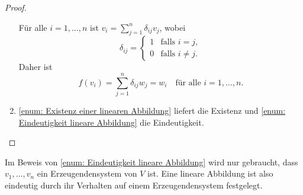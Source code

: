 \documentclass[a4paper,10pt]{article}
\begin{document}
\begin{proof}
\begin{enumerate}[label=\roman*)]
   Für alle $i = 1, \dotsc, n$ ist $v_i = \sum_{j=1}^n \delta_{ij} v_j$, wobei
   \[
    \delta_{ij} =
    \begin{cases}
     1 & \text{falls $i = j$}, \\
     0 & \text{falls $i \neq j$}.
    \end{cases}
   \]
   Daher ist
   \[
    f(v_i) = \sum_{j=1}^n \delta_{ij} w_j = w_i
    \quad \text{für alle $i = 1, \dotsc, n$}.
   \]
  
  \item
   \ref{enum: Existenz einer linearen Abbildung} liefert die Existenz und \ref{enum: Eindeutigkeit lineare Abbildung} die Eindeutigkeit.
  \qedhere
 \end{enumerate}
\end{proof}

\begin{bem}
  Im Beweis von \ref{enum: Eindeutigkeit lineare Abbildung} wird nur gebraucht, dass $v_1, \dotsc, v_n$ ein Erzeugendensystem von $V$ ist. Eine lineare Abbildung ist also eindeutig durch ihr Verhalten auf einem Erzeugendensystem festgelegt.
\end{bem}
\end{document}
